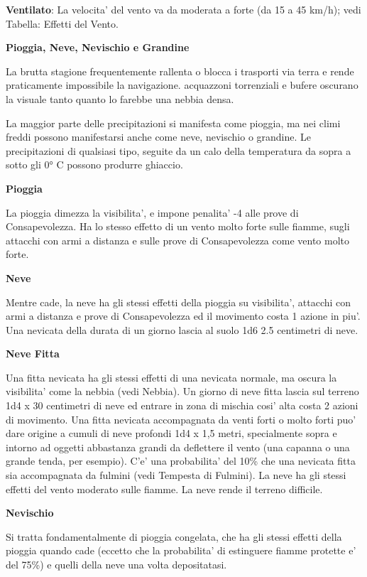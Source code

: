 \documentclass[a4paper,11pt,twoside,openany]{dndbook}
\begin{document}
{\textbf{Ventilato}: La velocita' del vento va da moderata a forte (da 15 a 45 km/h); vedi Tabella: Effetti del Vento.

\textbf{Pioggia, Neve, Nevischio e Grandine}

La brutta stagione frequentemente rallenta o blocca i trasporti via terra e rende praticamente impossibile la navigazione. acquazzoni torrenziali e bufere oscurano la visuale tanto quanto lo farebbe una nebbia densa.

La maggior parte delle precipitazioni si manifesta come pioggia, ma nei climi freddi possono manifestarsi anche come neve, nevischio o grandine. Le precipitazioni di qualsiasi tipo, seguite da un calo della temperatura da sopra a sotto gli 0° C possono produrre ghiaccio.

\textbf{Pioggia}

La pioggia dimezza la visibilita', e impone penalita' -4 alle prove di Consapevolezza. Ha lo stesso effetto di un vento molto forte sulle fiamme, sugli attacchi con armi a distanza e sulle prove di Consapevolezza come vento molto forte.

\textbf{Neve}

Mentre cade, la neve ha gli stessi effetti della pioggia su visibilita', attacchi con armi a distanza e prove di Consapevolezza ed il movimento costa 1 azione in piu'. Una nevicata della durata di un giorno lascia al suolo 1d6 \texttimes{} 2.5 centimetri di neve.

\textbf{Neve Fitta}

Una fitta nevicata ha gli stessi effetti di una nevicata normale, ma oscura la visibilita' come la nebbia (vedi Nebbia). Un giorno di neve fitta lascia sul terreno 1d4 x 30 centimetri di neve ed entrare in zona di mischia cosi' alta costa 2 azioni di movimento. Una fitta nevicata accompagnata da venti forti o molto forti puo' dare origine a cumuli di neve profondi 1d4 x 1,5 metri, specialmente sopra e intorno ad oggetti abbastanza grandi da deflettere il vento (una capanna o una grande tenda, per esempio).
C'e' una probabilita' del 10\% che una nevicata fitta sia accompagnata da fulmini (vedi Tempesta di Fulmini). La neve ha gli stessi effetti del vento moderato sulle fiamme. La neve rende il terreno difficile.

\textbf{Nevischio}

Si tratta fondamentalmente di pioggia congelata, che ha gli stessi effetti della pioggia quando cade (eccetto che la probabilita' di estinguere fiamme protette e' del 75\%) e quelli della neve una volta depositatasi.

}
\end{document}
